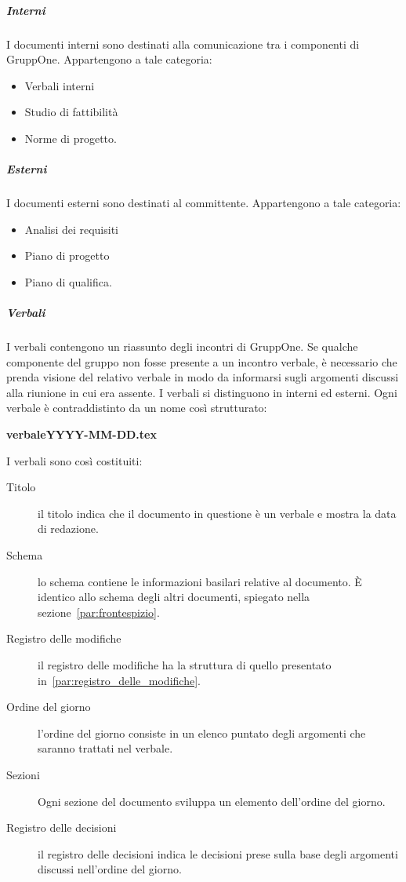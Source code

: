 \documentclass[../norme-di-progetto.tex]{subfiles}
\begin{document}
\subparagraph{Interni}%
\label{subp:suddivisione_dei_documenti/interni}
I documenti interni sono destinati alla comunicazione tra i componenti di GruppOne. Appartengono a tale categoria:

\begin{itemize}
  \item Verbali interni
  \item Studio di fattibilità
  \item Norme di progetto.
\end{itemize}

\subparagraph{Esterni}%
\label{subp:suddivisione_dei_documenti/esterni}
I documenti esterni sono destinati al committente. Appartengono a tale categoria:

\begin{itemize}
  \item Analisi dei requisiti
  \item Piano di progetto
  \item Piano di qualifica.
\end{itemize}

\subparagraph{Verbali}%
\label{subp:verbali}
I verbali contengono un riassunto degli incontri di GruppOne.
Se qualche componente del gruppo non fosse presente a un incontro verbale, è necessario che prenda visione del relativo verbale in modo da informarsi sugli argomenti discussi alla riunione in cui era assente.
I verbali si distinguono in interni ed esterni. Ogni verbale è contraddistinto da un nome così strutturato:
\begin{center}
  \textbf{verbaleYYYY-MM-DD.tex}
\end{center}
I verbali sono così costituiti:

\begin{description}
  \item [Titolo] il titolo indica che il documento in questione è un verbale e mostra la data di redazione.
  \item [Schema] lo schema contiene le informazioni basilari relative al documento. È identico allo schema degli altri documenti, spiegato nella sezione~\ref{par:frontespizio}.
  \item [Registro delle modifiche] il registro delle modifiche ha la struttura di quello presentato in~\ref{par:registro_delle_modifiche}.
  \item [Ordine del giorno] l'ordine del giorno consiste in un elenco puntato degli argomenti che saranno trattati nel verbale.
  \item [Sezioni] Ogni sezione del documento sviluppa un elemento dell'ordine del giorno.
  \item [Registro delle decisioni] il registro delle decisioni indica le decisioni prese sulla base degli argomenti discussi nell'ordine del giorno.
\end{description}
\end{document}
